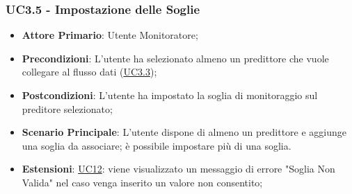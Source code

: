 	\subsubsection{UC3.5 - Impostazione delle Soglie}
		\begin{itemize}
			\item\textbf{Attore Primario}: Utente Monitoratore;
			\item\textbf{Precondizioni}: L'utente ha selezionato almeno un predittore che vuole collegare al flusso dati (\hyperref[par:UC3.3]{UC3.3});
			\item\textbf{Postcondizioni}: L’utente ha impostato la soglia di monitoraggio sul preditore selezionato;
			\item\textbf{Scenario Principale}: L’utente dispone di almeno un predittore e aggiunge una soglia da associare; è possibile impostare più di una soglia. 
			\item\textbf{Estensioni}: \hyperref[par:UC12]{UC12}: viene visualizzato un messaggio di errore "Soglia Non Valida" nel caso venga inserito un valore non consentito;	
		\end{itemize}

	\label{par:UC3.6}
